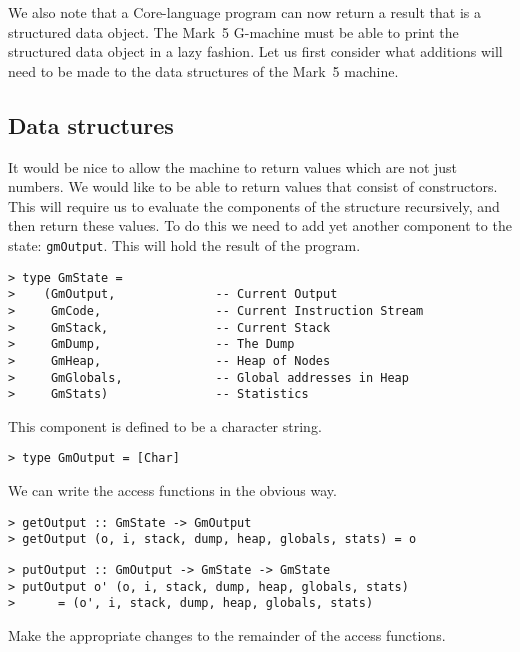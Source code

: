 We also note that a Core-language program can now return a result that
is a structured data object. The Mark~5 G-machine must be able to
print the structured data object in a lazy fashion. Let us first
consider what additions will need to be made to the data structures of
the Mark~5 machine.

\subsection{Data structures}

It would be nice to allow the machine to return values which are not
just numbers. We would like to be able to return values that consist
of constructors. This will require us to evaluate the components of
the structure recursively, and then return these values. To do this we
need to add yet another component to the state: \mbox{\tt gmOutput}. This will
hold the result of the program.
\begin{verbatim}
> type GmState =
>    (GmOutput,              -- Current Output
>     GmCode,                -- Current Instruction Stream
>     GmStack,               -- Current Stack
>     GmDump,                -- The Dump
>     GmHeap,                -- Heap of Nodes
>     GmGlobals,             -- Global addresses in Heap
>     GmStats)               -- Statistics
\end{verbatim}
%
This component is defined to be a character string.
\begin{verbatim}
> type GmOutput = [Char]
\end{verbatim}
%
\par
We can write the access functions in the obvious way.
\begin{verbatim}
> getOutput :: GmState -> GmOutput
> getOutput (o, i, stack, dump, heap, globals, stats) = o
\end{verbatim}
%
%
\begin{verbatim}
> putOutput :: GmOutput -> GmState -> GmState
> putOutput o' (o, i, stack, dump, heap, globals, stats)
>      = (o', i, stack, dump, heap, globals, stats)
\end{verbatim}
%
%
\begin{exercise}\label{gm:X:access5}
Make the appropriate changes to the remainder of the access functions.
\end{exercise}

